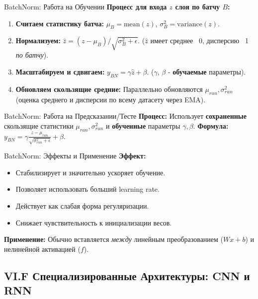 \begin{myexampleblock}{BatchNorm: Работа на Обучении}
    \textbf{Процесс для входа $z$ слоя по батчу $B$:}
    \begin{enumerate}[nosep, itemsep=0.5ex]
        \item \textbf{Считаем статистику батча:} $\mu_B = \text{mean}(z)$, $\sigma^2_B = \text{variance}(z)$.
        \item \textbf{Нормализуем:} $\hat{z} = (z - \mu_B) / \sqrt{\sigma^2_B + \epsilon}$. ($\hat{z}$ имеет среднее ~0, дисперсию ~1 \textit{по батчу}).
        \item \textbf{Масштабируем и сдвигаем:} $y_{BN} = \gamma \hat{z} + \beta$. ($\gamma$, $\beta$ - \textbf{обучаемые} параметры).
        \item \textbf{Обновляем скользящие средние:} Параллельно обновляются $\mu_{run}, \sigma^2_{run}$ (оценка среднего и дисперсии по всему датасету через EMA).
    \end{enumerate}
\end{myexampleblock}

\begin{myexampleblock}{BatchNorm: Работа на Предсказании/Тесте}
    \textbf{Процесс:} Использует \textbf{сохраненные} скользящие статистики $\mu_{run}, \sigma^2_{run}$ и \textbf{обученные} параметры $\gamma, \beta$.
    \textbf{Формула:} $y_{BN} = \gamma \frac{z - \mu_{run}}{\sqrt{\sigma^2_{run} + \epsilon}} + \beta$.
\end{myexampleblock}

\begin{myexampleblock}{BatchNorm: Эффекты и Применение}
    \textbf{Эффект:}
    \begin{itemize}[nosep, leftmargin=*]
        \item Стабилизирует и значительно ускоряет обучение.
        \item Позволяет использовать больший learning rate.
        \item Действует как слабая форма регуляризации.
        \item Снижает чувствительность к инициализации весов.
    \end{itemize}
    \textbf{Применение:} Обычно вставляется \textit{между} линейным преобразованием ($W x + b$) и нелинейной активацией ($f$).
\end{myexampleblock}

\subsection{VI.F Специализированные Архитектуры: CNN и RNN}

